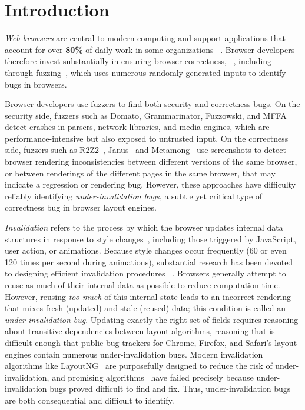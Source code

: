 \section{Introduction}

\textit{Web browsers} are central to modern computing and
  support applications that account for
  over \textbf{80\%} of daily work in some organizations%
  ~\cite{montenegro2025workforce}.
Browser developers therefore invest substantially
  in ensuring browser correctness,%
  ~\cite{google-project-zero,mozilla-mythos,w3c,whatwg,wpt,interop},
  including through fuzzing~\cite{clusterfuzz},
  which uses numerous randomly generated inputs
  to identify bugs in browsers.

Browser developers use fuzzers to find both
  security and correctness bugs.
On the security side, fuzzers such as
  Domato, Grammarinator, Fuzzowski, and MFFA%
  ~\cite{domato,grammarinator,fuzzowski,mffa}
  detect crashes in parsers, network libraries, and media engines,
  which are performance-intensive
  but also exposed to untrusted input.
On the correctness side, fuzzers such as
  R2Z2~\cite{song2022r2z2}, Janus~\cite{zhou2025janus}
  and Metamong~\cite{song2023metamong}
  use screenshots to detect browser rendering inconsistencies
  between different versions of the same browser,
  or between renderings of the different pages in the same browser,
  that may indicate a regression or rendering bug.
However, these approaches have difficulty
  reliably identifying \emph{under-invalidation bugs},
  a subtle yet critical type of correctness bug
  in browser layout engines.

\emph{Invalidation} refers to the process by which
  the browser updates internal data structures
  in response to style changes~\cite{panchekha2024reusing},
  including those triggered by JavaScript,
  user action, or animations.
Because style changes occur frequently
  (60 or even 120 times per second during animations),
  substantial research has been devoted
  to designing efficient invalidation procedures%
  ~\cite{megatron,liu2023medea}.
Browsers generally attempt to reuse as much
  of their internal data as possible to reduce computation time.
However, reusing \emph{too much} of this internal state
  leads to an incorrect rendering that mixes
  fresh (updated) and stale (reused) data;
  this condition is called an \emph{under-invalidation bug}.
Updating exactly the right set of fields requires
  reasoning about transitive dependencies between layout algorithms,
  reasoning that is difficult enough that public bug trackers
  for Chrome, Firefox, and Safari's layout engines
  contain numerous under-invalidation bugs.
Modern invalidation algorithms like LayoutNG~\cite{kilpatrick2021layoutng}
  are purposefully designed to reduce the risk of under-invalidation,
  and promising algorithms~\cite{mozilla2006reflow} have failed
  precisely because under-invalidation bugs proved
  difficult to find and fix.
Thus, under-invalidation bugs are both consequential and
  difficult to identify.


